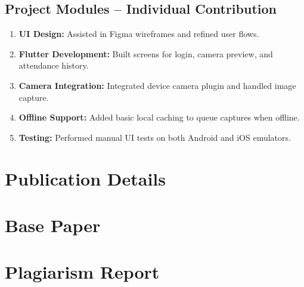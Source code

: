 \documentclass[openany]{report}
\begin{document}
\section{Project Modules – Individual Contribution}
\begin{enumerate}
  \item \textbf{UI Design:} Assisted in Figma wireframes and refined user flows.
  \item \textbf{Flutter Development:} Built screens for login, camera preview, and attendance history.
  \item \textbf{Camera Integration:} Integrated device camera plugin and handled image capture.
  \item \textbf{Offline Support:} Added basic local caching to queue captures when offline.
  \item \textbf{Testing:} Performed manual UI tests on both Android and iOS emulators.
\end{enumerate}

\appendix

\chapter{Publication Details}

\chapter{Base Paper}

\chapter{Plagiarism Report}
\end{document}
